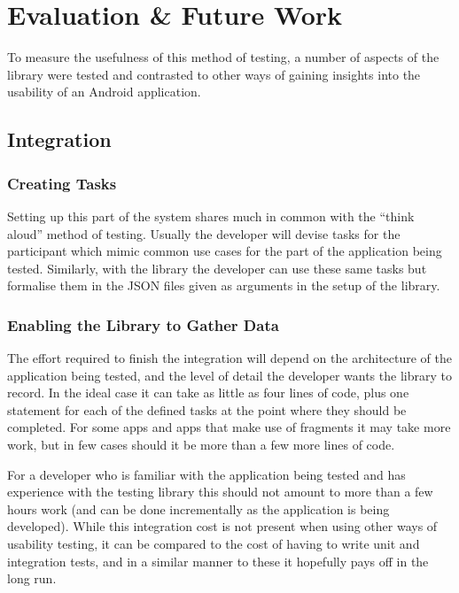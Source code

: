 \chapter{Evaluation \& Future Work}

To measure the usefulness of this method of testing, a number of
aspects of the library were tested and contrasted to other ways of
gaining insights into the usability of an Android application.

\section{Integration}

\subsection{Creating Tasks}

Setting up this part of the system shares much in common with the
``think aloud'' method of testing.  Usually the developer will
devise tasks for the participant which mimic common use cases for
the part of the application being tested. Similarly, with the library
the developer can use these same tasks but formalise them in the
JSON files given as arguments in the setup of the library.

\subsection{Enabling the Library to Gather Data}

The effort required to finish the integration will depend on the
architecture of the application being tested, and the level of
detail the developer wants the library to record. In the ideal case
it can take as little as four 
lines of code, plus one statement for each of the defined tasks at
the point where they should be completed. For some apps and apps
that make use of fragments it may take more work, but in few cases
should it be more than a few more lines of code.

For a developer who is familiar with the application being tested
and has experience with the testing library this should not amount
to more than a few hours work (and can be done incrementally as the
application is being developed). While this integration cost is not
present when using other ways of usability testing, it can be
compared to the cost of having to write unit and integration tests,
and in a similar manner to these it hopefully pays off in the long
run.

